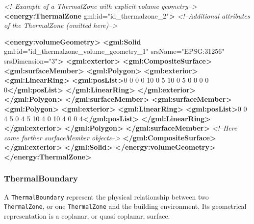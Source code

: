 \documentclass[a4paper,12pt]{article}
\newenvironment{Shaded}{}{}
\newcommand{\KeywordTok}[1]{\textcolor[rgb]{0.00,0.44,0.13}{\textbf{{#1}}}}
\newcommand{\StringTok}[1]{\textcolor[rgb]{0.25,0.44,0.63}{{#1}}}
\newcommand{\CommentTok}[1]{\textcolor[rgb]{0.38,0.63,0.69}{\textit{{#1}}}}
\newcommand{\OtherTok}[1]{\textcolor[rgb]{0.00,0.44,0.13}{{#1}}}
\newcommand{\NormalTok}[1]{{#1}}
\begin{document}
\begin{Shaded}
\begin{Highlighting}[]
\CommentTok{<!--Example of a ThermalZone with explicit volume geometry-->}
\KeywordTok{<energy:ThermalZone}\OtherTok{ gml:id=}\StringTok{"id_thermalzone_2"}\KeywordTok{>}
    \CommentTok{<!--Additional attributes of the ThermalZone (omitted here)-->}

    \KeywordTok{<energy:volumeGeometry>}
        \KeywordTok{<gml:Solid}\OtherTok{ gml:id=}\StringTok{"id_thermalzone_volume_geometry_1"}\OtherTok{ srsName=}\StringTok{"EPSG:31256"}\OtherTok{ srsDimension=}\StringTok{"3"}\KeywordTok{>}
            \KeywordTok{<gml:exterior>}
                \KeywordTok{<gml:CompositeSurface>}
                    \KeywordTok{<gml:surfaceMember>}
                        \KeywordTok{<gml:Polygon>}
                            \KeywordTok{<gml:exterior>}
                                \KeywordTok{<gml:LinearRing>}
                                    \KeywordTok{<gml:posList>}\NormalTok{0 0 0 0 10 0 5 10 0 5 0 0 0 0 0}\KeywordTok{</gml:posList>}
                                \KeywordTok{</gml:LinearRing>}
                            \KeywordTok{</gml:exterior>}
                        \KeywordTok{</gml:Polygon>}
                    \KeywordTok{</gml:surfaceMember>}
                    \KeywordTok{<gml:surfaceMember>}
                        \KeywordTok{<gml:Polygon>}
                            \KeywordTok{<gml:exterior>}
                                \KeywordTok{<gml:LinearRing>}
                                    \KeywordTok{<gml:posList>}\NormalTok{0 0 4 5 0 4 5 10 4 0 10 4 0 0 4}\KeywordTok{</gml:posList>}
                                \KeywordTok{</gml:LinearRing>}
                            \KeywordTok{</gml:exterior>}
                        \KeywordTok{</gml:Polygon>}
                    \KeywordTok{</gml:surfaceMember>}
                    \CommentTok{<!--Here come further surfaceMember objects-->}
                    \KeywordTok{</gml:CompositeSurface>}
            \KeywordTok{</gml:exterior>}
        \KeywordTok{</gml:Solid>}
    \KeywordTok{</energy:volumeGeometry>}
\KeywordTok{</energy:ThermalZone>}
\end{Highlighting}
\end{Shaded}

\subsubsection{ThermalBoundary}\label{thermalboundary}

A \texttt{ThermalBoundary} represent the physical relationship between
two \texttt{ThermalZone}, or one \texttt{ThermalZone} and the building
environment. Its geometrical representation is a coplanar, or quasi
coplanar, surface.
\end{document}
